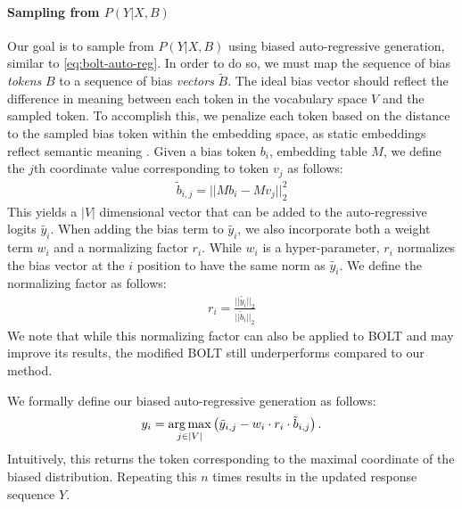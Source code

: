 \paragraph{Sampling from $P(Y | X, B)$}
Our goal is to sample from $P(Y | X, B)$ using biased auto-regressive generation, similar to \eqref{eq:bolt-auto-reg}. 
In order to do so, we must map the sequence of bias \textit{tokens} $B$ to a sequence of bias \textit{vectors} $\tilde{B}$.  
The ideal bias vector should reflect the difference in meaning between each token in the vocabulary space $V$ and the sampled token.
To accomplish this, we penalize each token based on the distance to the sampled bias token within the embedding space, as static embeddings reflect semantic meaning \citep{mikolov2013efficient, pennington2014glove, mikolov2013distributed}. Given a bias token $b_i$, embedding table $M$, we define the $j$th coordinate value corresponding to token $v_j$ as follows: 
\begin{align}
\label{eq:bias-vec-def}
    \tilde{b}_{i,j} = || Mb_i - Mv_j||^2_2 
\end{align}
This yields a $|V|$ dimensional vector that can be added to the auto-regressive logits $\tilde{y_i}$. 
When adding the bias term to $\tilde{y_i}$, we also incorporate both a weight term $w_i$ and a normalizing factor $r_i$. While $w_i$ is a hyper-parameter, $r_i$ normalizes the bias vector at the $i$ position to have the same norm as $\tilde{y_i}$. We define the normalizing factor as follows: 
\begin{align}
    \label{eq:dab-normalize}
    r_i = \frac{|| \tilde{y_i} ||_2}{|| \tilde{b}_i ||_2}
\end{align}
We note that while this normalizing factor can also be applied to BOLT and may improve its results, the modified BOLT still underperforms compared to our method. 

We formally define our biased auto-regressive generation as follows: 
\begin{align}
    \label{eq:dab-auto-reg}
    y_i = \operatorname*{arg\,max}_{j \in |V|} \left( \tilde{y}_{i, j} - w_i \cdot r_i \cdot \tilde{b}_{i, j}\right). 
\end{align}
Intuitively, this returns the token corresponding to the maximal coordinate of the biased distribution. Repeating this $n$ times results in the updated response sequence $Y$. 


